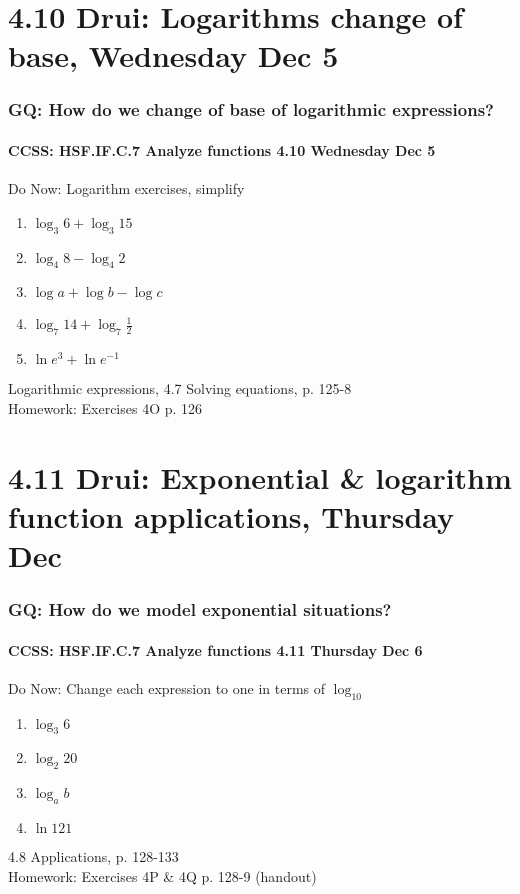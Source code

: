 \documentclass{beamer}
\begin{document}
  \section{4.10 Drui: Logarithms change of base, Wednesday Dec 5}
    \frame
    {
      \frametitle{GQ: How do we change of base of logarithmic expressions?}
      \framesubtitle{CCSS: HSF.IF.C.7 Analyze functions    \alert{4.10 Wednesday Dec 5}}

      \begin{block}{Do Now: Logarithm exercises, simplify}
        \begin{enumerate}
            \item $\log_3 6 + \log_3 15$
            \item $\log_4 8 - \log_4 2$
            \item $\log a + \log b - \log c$
            \item $\displaystyle \log_7 14 + \log_7 \frac{1}{2}$
            \item $\ln e^3 +\ln e^{-1}$
        \end{enumerate}
      \end{block}
      Logarithmic expressions, 4.7 Solving equations, p. 125-8\\ \bigskip
      Homework: Exercises 4O p. 126
    }

  \section{4.11 Drui: Exponential \& logarithm function applications, Thursday Dec }
    \frame
    {
      \frametitle{GQ: How do we model exponential situations?}
      \framesubtitle{CCSS: HSF.IF.C.7 Analyze functions    \alert{4.11 Thursday Dec 6}}

      \begin{block}{Do Now: Change each expression to one in terms of $\log_{10}$}
        \begin{enumerate}
            \item $\log_3 6$
            \item $\log_2 20$
            \item $\log_a b$
            \item $\ln 121$
        \end{enumerate}
      \end{block}
      4.8 Applications, p. 128-133\\ \bigskip
      Homework: Exercises 4P \& 4Q p. 128-9 (handout)
    }
\end{document}
